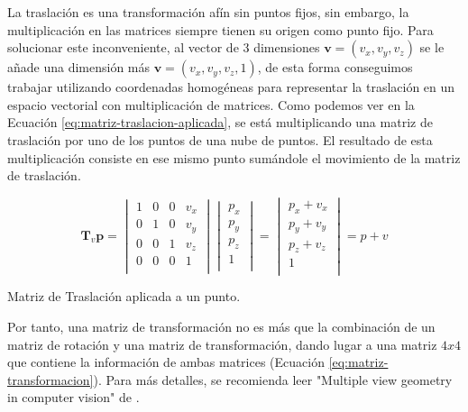 La traslación es una transformación afín sin puntos fijos, sin embargo, la multiplicación en las matrices siempre tienen su origen como punto fijo.
Para solucionar este inconveniente, al vector de 3 dimensiones $\mathbf {v}=(v_{x},v_{y},v_{z})$ se le añade una dimensión más $\mathbf {v}=(v_{x},v_{y},v_{z},1)$, de esta forma conseguimos trabajar utilizando coordenadas homogéneas para representar la traslación en un espacio vectorial con multiplicación de matrices.
Como podemos ver en la Ecuación \ref{eq:matriz-traslacion-aplicada}, se está multiplicando una matriz de traslación por uno de los puntos de una nube de puntos.
El resultado de esta multiplicación consiste en ese mismo punto sumándole el movimiento de la matriz de traslación.

\begin{customequation}[h!]
    \begin{equation}
        \mathbf{T}_{v}
        \mathbf{p}
        =
        \begin{vmatrix}
            1 & 0 & 0 & v_{x} \\
            0 & 1 & 0 & v_{y} \\
            0 & 0 & 1 & v_{z} \\
            0 & 0 & 0 & 1 \\
        \end{vmatrix}
        \begin{vmatrix}
            p_{x} \\
            p_{y} \\
            p_{z} \\
            1 \\
        \end{vmatrix}
        =
        \begin{vmatrix}
            p_{x} + v_{x} \\
            p_{y} + v_{y} \\
            p_{z} + v_{z} \\
            1 \\
        \end{vmatrix}
        = p + v
    \end{equation}
    \caption{Matriz de Traslación aplicada a un punto.}
    \label{eq:matriz-traslacion-aplicada}
\end{customequation}

Por tanto, una matriz de transformación no es más que la combinación de un matriz de rotación y una matriz de transformación, dando lugar a una matriz $4x4$ que contiene la información de ambas matrices (Ecuación \ref{eq:matriz-transformacion}). Para más detalles, se recomienda leer "Multiple view geometry in computer vision" de \cite{hartley2003multiple}.

